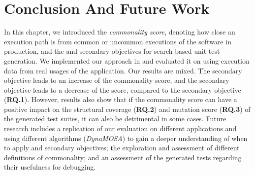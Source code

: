 

\section{Conclusion And Future Work}
\label{sec:cub:conclusion}

In this chapter, we introduced the \emph{commonality score}, denoting how close an execution path is from common or uncommon executions of the software in production, and the \com and \ucom secondary objectives for search-based unit test generation. 
We implemented our approach in \evosuite and evaluated it on \jabref using execution data from real usages of the application. 
Our results are mixed. The \com secondary objective leads to an increase of the commonality score, and the \ucom secondary objective leads to a decrease of the score, compared to the \df secondary objective (\textbf{RQ.1}).
However, results also show that if the commonality score can have a positive impact on the structural coverage (\textbf{RQ.2}) and mutation score (\textbf{RQ.3}) of the generated test suites, it can also be detrimental in some cases. 
Future research includes a replication of our evaluation on different applications and using different algorithms (\eg \textit{DynaMOSA}) to gain a deeper understanding of when to apply \com and \ucom secondary objectives; the exploration and assessment of different definitions of commonality; and an assessment of the generated tests regarding their usefulness for debugging. 


